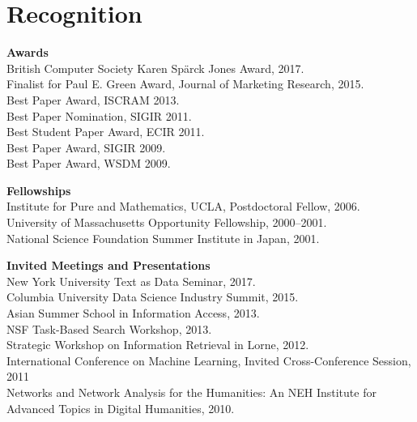 \documentclass{article}
\begin{document}
\section{Recognition}\noindent\textbf{Awards}\\
British Computer Society Karen Sp{\"a}rck Jones Award, 2017.  \\
Finalist for Paul E. Green Award, Journal of Marketing Research, 2015.  \\
Best Paper Award, ISCRAM 2013.  \\
Best Paper Nomination, SIGIR 2011.  \\
Best Student Paper Award, ECIR 2011.\\
Best Paper Award, SIGIR 2009.  \\
Best Paper Award, WSDM 2009.

\vspace{\baselineskip}
\noindent\textbf{Fellowships}\\
Institute for Pure and Mathematics, UCLA, Postdoctoral Fellow, 2006.\\
University of Massachusetts Opportunity Fellowship, 2000–2001.\\
National Science Foundation Summer Institute in Japan, 2001.

\vspace{\baselineskip}
\noindent\textbf{Invited Meetings and Presentations}\\
New York University Text as Data Seminar, 2017.\\
Columbia University Data Science Industry Summit, 2015.\\
Asian Summer School in Information Access, 2013.\\
NSF Task-Based Search Workshop, 2013.\\
Strategic Workshop on Information Retrieval in Lorne, 2012.\\
International Conference on Machine Learning, Invited Cross-Conference Session, 2011\\
Networks and Network Analysis for the Humanities: An NEH Institute for Advanced Topics in Digital Humanities, 2010.
\end{document}
